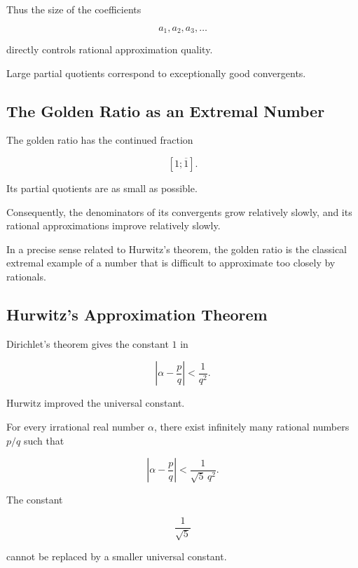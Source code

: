 Thus the size of the coefficients

\[ a_1,a_2,a_3,\ldots \]

directly controls rational approximation quality.

Large partial quotients correspond to exceptionally good convergents.

\subsection{The Golden Ratio as an Extremal Number}
\label{subsec:golden-ratio-hardest-approximate}

The golden ratio has the continued fraction

\[ [1;\overline1]. \]

Its partial quotients are as small as possible.

Consequently, the denominators of its convergents grow relatively slowly,
and its rational approximations improve relatively slowly.

In a precise sense related to Hurwitz's theorem, the golden ratio is the
classical extremal example of a number that is difficult to approximate too
closely by rationals.

\subsection{Hurwitz's Approximation Theorem}
\label{subsec:hurwitz-theorem}

Dirichlet's theorem gives the constant \(1\) in

\[ \left|\alpha-\frac pq\right|<\frac1{q^2}. \]

Hurwitz improved the universal constant.

\begin{theorem}[Hurwitz]
For every irrational real number \(\alpha\), there exist infinitely many
rational numbers \(p/q\) such that

\[ \boxed{\left|\alpha-\frac pq\right|<\frac1{\sqrt5\,q^2}.} \]
\end{theorem}

The constant

\[ \frac1{\sqrt5} \]

cannot be replaced by a smaller universal constant.

